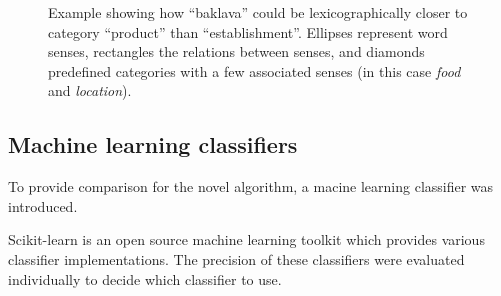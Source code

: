\documentclass[a4paper,11pt]{kth-mag}
\begin{document}
\begin{figure}[t]
  \centering
  \caption{Example showing how ``baklava'' could be lexicographically closer to category ``product'' than ``establishment''. Ellipses represent word senses, rectangles the relations between senses, and diamonds predefined categories with a few associated senses (in this case \emph{food} and \emph{location}).}
  \label{fig:baklava_lex}
\end{figure}

\clearpage
\subsection{Machine learning classifiers}
To provide comparison for the novel algorithm, a macine learning classifier was introduced.

Scikit-learn\cite{scikit-learn} is an open source machine learning toolkit which provides various
classifier implementations.
The precision of these classifiers were evaluated individually to decide which classifier to use.
\end{document}
